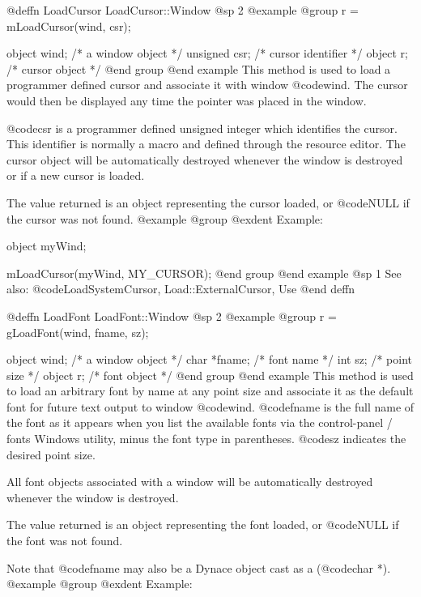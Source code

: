 @deffn {LoadCursor} LoadCursor::Window
@sp 2
@example
@group
r = mLoadCursor(wind, csr);

object   wind;  /*  a window object    */
unsigned csr;   /*  cursor identifier  */
object   r;     /*  cursor object      */
@end group
@end example
This method is used to load a programmer defined cursor and associate it
with window @code{wind}.  The cursor would then be displayed any time
the pointer was placed in the window.

@code{csr} is a programmer defined unsigned integer which identifies
the cursor.  This identifier is normally a macro and defined through the
resource editor.  The cursor object will be automatically destroyed
whenever the window is destroyed or if a new cursor is loaded.

The value returned is an object representing the cursor loaded, or
@code{NULL} if the cursor was not found.
@example
@group
@exdent Example:

object  myWind;

mLoadCursor(myWind, MY_CURSOR);
@end group
@end example
@sp 1
See also:  @code{LoadSystemCursor, Load::ExternalCursor, Use}
@end deffn











@deffn {LoadFont} LoadFont::Window
@sp 2
@example
@group
r = gLoadFont(wind, fname, sz);

object   wind;  /*  a window object  */
char    *fname; /*  font name        */
int      sz;    /*  point size       */
object   r;     /*  font object      */
@end group
@end example
This method is used to load an arbitrary font by name at any point size
and associate it as the default font for future text output to window
@code{wind}.  @code{fname} is the full name of the font as it appears
when you list the available fonts via the control-panel / fonts Windows
utility, minus the font type in parentheses.  @code{sz} indicates the
desired point size.

All font objects associated with a window will be automatically
destroyed whenever the window is destroyed.

The value returned is an object representing the font loaded, or
@code{NULL} if the font was not found.

Note that @code{fname} may also be a Dynace object cast as a (@code{char *}).
@example
@group
@exdent Example:

